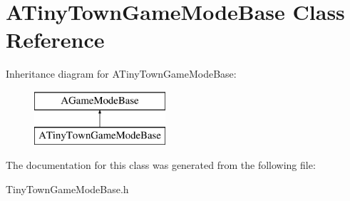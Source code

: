 \hypertarget{class_a_tiny_town_game_mode_base}{}\section{A\+Tiny\+Town\+Game\+Mode\+Base Class Reference}
\label{class_a_tiny_town_game_mode_base}
Inheritance diagram for A\+Tiny\+Town\+Game\+Mode\+Base\+:\begin{figure}[H]
\begin{center}
\leavevmode
\includegraphics[height=2.000000cm]{class_a_tiny_town_game_mode_base}
\end{center}
\end{figure}


The documentation for this class was generated from the following file\+:\begin{DoxyCompactItemize}
\item 
Tiny\+Town\+Game\+Mode\+Base.\+h\end{DoxyCompactItemize}
